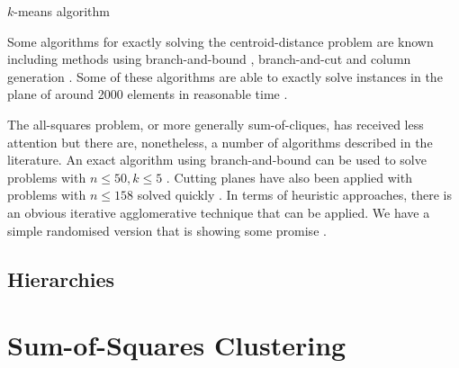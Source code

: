 \documentclass[a4paper]{report}
\newcommand{\clus}{\mathcal{C}}
\begin{document}
\begin{algorithm}
  \caption{$k$-means algorithm}
  \label{alg:k-means}

\end{algorithm}



Some algorithms for exactly solving the centroid-distance problem are known
including methods using branch-and-bound \citep{brusco2006repetitive},
branch-and-cut \citep{aloise09exact} and column generation
\citep{merle1999interior}.  Some of these algorithms are able to exactly solve
instances in the plane of around 2000 elements in reasonable time
\citep{aloise09exact}.

The all-squares problem, or more generally sum-of-cliques, has received less
attention but there are, nonetheless, a number of algorithms described in the
literature.  An exact algorithm using branch-and-bound
\citep{klein1991optimal} can be used to solve problems with $n , k $ \citep{hansen1997mathprog}.  Cutting planes have also been applied with
problems with $n $ solved quickly
\citep{hansen1997mathprog,palubeckis1997branch}.  In terms of heuristic
approaches, there is an obvious iterative agglomerative technique that can be
applied.  We have a simple randomised version that is showing some promise
\citep{gk2012agglomerative}.

\section{Hierarchies}
\label{sec:hierarchies}



\chapter{Sum-of-Squares Clustering}
\label{cha:sum-squar-clust}
\end{document}

